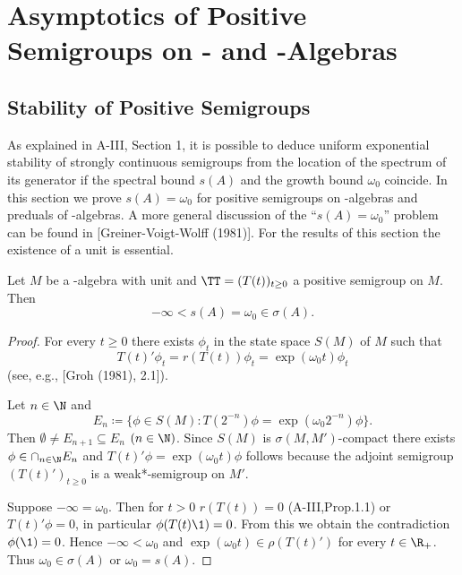 

\chapter{Asymptotics of Positive Semigroups on \CA- and \WA-Algebras}\label{chap:D-IV}

\section{Stability of Positive Semigroups}\label{sec:d4-1}

As explained in A-III, Section 1, it is possible to deduce uniform exponential stability of strongly continuous semigroups from the location of the spectrum of its generator if the spectral bound $ s(A) $ and the growth bound $ \omega_{0} $ coincide.
In this section we prove $s(A) = \omega_{0}$ for positive semigroups on \CA-algebras and preduals of \WA-algebras.
A more general discussion of the \enquote{$s(A) = \omega_{0}$} problem can be found in [Greiner-Voigt-Wolff (1981)].
For the results of this section the existence of a unit is essential.
\begin{theorem}\label{thm:d4-1.1}
Let $M$ be a \CA-algebra with unit and $\TT = (T(t))_{t \geq 0}$ a positive semigroup on $M$.
Then
\[
	-\infty < s(A) = \omega_{0} \in \sigma(A).
\]
\end{theorem}
\begin{proof}
For every  $t \geq 0 $ there exists $\phi_{t}$ in the state space $S(M)$ of $M$ such that
\[
	T(t)'\phi_{t} = r(T(t))\phi_{t} = \exp(\omega_{0} t)\phi_{t}
\]
(see, e.g., [Groh (1981), 2.1]).

Let $n \in \N$ and
\[
E_{n} \coloneqq \{\phi \in S(M) \colon T(2^{-n})\phi = \exp(\omega_{0} 2^{-n})\phi \}.
\]
Then $\emptyset \neq E_{n+1} \subseteq E_{n}$ $(n \in \N)$.
Since $S(M)$ is $\sigma(M,M')$-compact there exists $\phi \in \cap_{n \in \N} E_{n}$ and $ T(t)'\phi = \exp(\omega_{0} t)\phi$ follows because the adjoint semigroup $(T(t)')_{t \geq 0}$ is a weak*-semigroup on $M'$.

Suppose $-\infty = \omega_{0}$.
Then for $t > 0$ $r(T(t)) = 0$ (A-III,Prop.1.1) or $T(t)'\phi = 0$, in particular $\phi(T(t)\1) = 0$.
From this we obtain the contradiction $\phi(\1) = 0$.
Hence $-\infty < \omega_{0}$ and $\exp(\omega_{0} t) \in \rho(T(t)')$ for every $t \in \R_{+}$.
Thus $\omega_{0} \in \sigma(A)$ or $\omega_{0} = s(A)$.
\end{proof}

